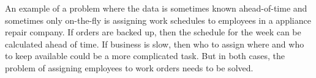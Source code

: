 \documentclass{article}
\begin{document}
\subsubsection{}
    An example of a problem where the data is sometimes known ahead-of-time and sometimes only on-the-fly is assigning work schedules to employees in a appliance repair company.  If orders are backed up, then the schedule for the week can be calculated ahead of time.  If business is slow, then who to assign where and who to keep available could be a more complicated task.  But in both cases, the problem of assigning employees to work orders needs to be solved.




\end{document}
